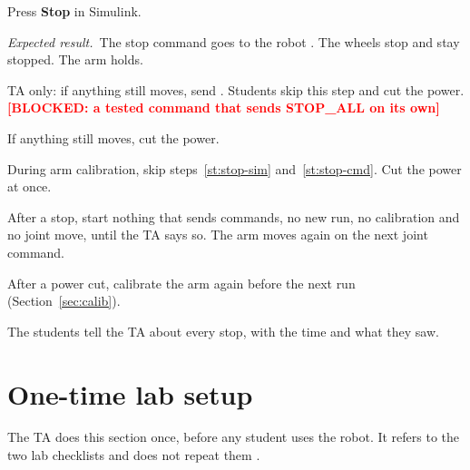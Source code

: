 \documentclass[11pt]{article}
\newcommand{\todo}[1]{\textcolor{red}{\textbf{[#1]}}}
\newcommand{\cmd}[1]{\texttt{\romecode{#1}}}
\newif\ifshowsrc
\newcommand{\src}[1]{\ifshowsrc{\scriptsize\,[\texttt{\romecode{#1}}]}\fi}
\newcommand{\expect}{\par\textit{Expected result.}\ }
\newcommand{\substep}{\thesubsection.\arabic*}
\begin{document}
\begin{steps}[label=\substep]
  \item\label{st:stop-sim} Press \textbf{Stop} in Simulink.
  \expect The stop command \cmd{STOP_ALL} goes to the robot \src{ROMECommand.m:197-200}. The wheels
  stop and stay stopped. The arm holds.
  \item\label{st:stop-cmd} TA only: if anything still moves, send \cmd{STOP_ALL}. Students skip this step and cut the
  power.
  \todo{BLOCKED: a tested command that sends STOP\_ALL on its own}
  \item\label{st:stop-power} If anything still moves, cut the power.
  \item During arm calibration, skip steps~\ref{st:stop-sim} and~\ref{st:stop-cmd}. Cut the power at once.
  \item After a stop, start nothing that sends commands, no new run, no calibration and no joint
  move, until the TA says so. The arm moves again on the next joint command.
  \item After a power cut, calibrate the arm again before the next run (Section~\ref{sec:calib}).
  \item The students tell the TA about every stop, with the time and what they saw.
\end{steps}

\section{One-time lab setup}\label{sec:setup}
The TA does this section once, before any student uses the robot. It refers to the two lab
checklists and does not repeat them \src{docs/lab/PART_C_LAB_VISIT.md; docs/lab/PART_F_BENCH_CHECKLIST.md}.
\end{document}
